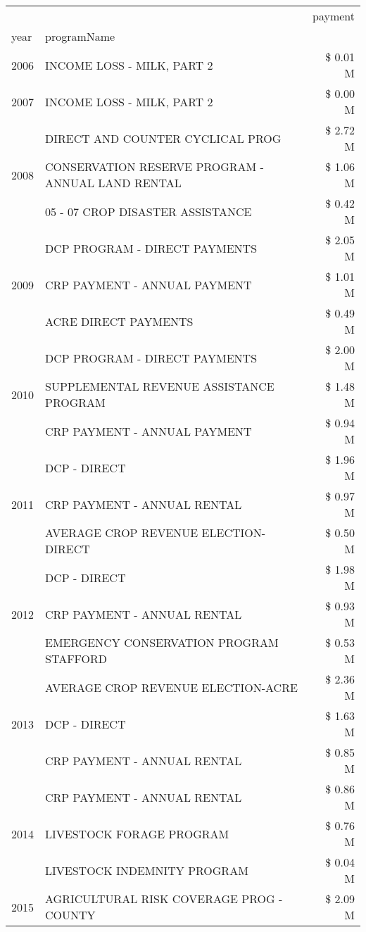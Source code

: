 \begin{tabular}{llr}
\toprule
 &  & payment \\
year & programName &  \\
\midrule
2006 & INCOME LOSS - MILK, PART 2 & \$ 0.01 M \\
\cline{1-3}
2007 & INCOME LOSS - MILK, PART 2 & \$ 0.00 M \\
\cline{1-3}
\multirow[t]{3}{*}{2008} & DIRECT AND COUNTER CYCLICAL PROG & \$ 2.72 M \\
 & CONSERVATION RESERVE PROGRAM - ANNUAL LAND RENTAL & \$ 1.06 M \\
 & 05 - 07 CROP DISASTER ASSISTANCE & \$ 0.42 M \\
\cline{1-3}
\multirow[t]{3}{*}{2009} & DCP PROGRAM - DIRECT PAYMENTS & \$ 2.05 M \\
 & CRP PAYMENT - ANNUAL PAYMENT & \$ 1.01 M \\
 & ACRE DIRECT PAYMENTS & \$ 0.49 M \\
\cline{1-3}
\multirow[t]{3}{*}{2010} & DCP PROGRAM - DIRECT PAYMENTS & \$ 2.00 M \\
 & SUPPLEMENTAL REVENUE ASSISTANCE PROGRAM & \$ 1.48 M \\
 & CRP PAYMENT - ANNUAL PAYMENT & \$ 0.94 M \\
\cline{1-3}
\multirow[t]{3}{*}{2011} & DCP - DIRECT & \$ 1.96 M \\
 & CRP PAYMENT - ANNUAL RENTAL & \$ 0.97 M \\
 & AVERAGE CROP REVENUE ELECTION-DIRECT & \$ 0.50 M \\
\cline{1-3}
\multirow[t]{3}{*}{2012} & DCP - DIRECT & \$ 1.98 M \\
 & CRP PAYMENT - ANNUAL RENTAL & \$ 0.93 M \\
 & EMERGENCY CONSERVATION PROGRAM STAFFORD & \$ 0.53 M \\
\cline{1-3}
\multirow[t]{3}{*}{2013} & AVERAGE CROP REVENUE ELECTION-ACRE & \$ 2.36 M \\
 & DCP - DIRECT & \$ 1.63 M \\
 & CRP PAYMENT - ANNUAL RENTAL & \$ 0.85 M \\
\cline{1-3}
\multirow[t]{3}{*}{2014} & CRP PAYMENT - ANNUAL RENTAL & \$ 0.86 M \\
 & LIVESTOCK FORAGE PROGRAM & \$ 0.76 M \\
 & LIVESTOCK INDEMNITY PROGRAM & \$ 0.04 M \\
\cline{1-3}
\multirow[t]{3}{*}{2015} & AGRICULTURAL RISK COVERAGE PROG - COUNTY & \$ 2.09 M \\

\end{tabular}
